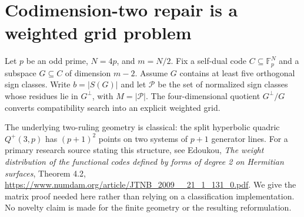 \section{Codimension-two repair is a weighted grid problem}
\label{sec:quotient-grid}

Let $p$ be an odd prime, $N=4p$, and $m=N/2$. Fix a self-dual code
$C\subseteq\mathbb F_p^N$ and a subspace $G\subseteq C$ of dimension
$m-2$. Assume $G$ contains at least five orthogonal sign classes.
Write $b=|S(G)|$ and let $\mathcal P$ be the set of normalized sign
classes whose residues lie in $G^\perp$, with $M=|\mathcal P|$.
The four-dimensional quotient $G^\perp/G$ converts compatibility
search into an explicit weighted grid.

The underlying two-ruling geometry is classical: the split hyperbolic
quadric $Q^+(3,p)$ has $(p+1)^2$ points on two systems of $p+1$
generator lines. For a primary research source stating this structure,
see Edoukou, \emph{The weight distribution of the functional codes
defined by forms of degree 2 on Hermitian surfaces}, Theorem 4.2,
\url{https://www.numdam.org/article/JTNB_2009__21_1_131_0.pdf}.
We give the matrix proof needed here rather than relying on a
classification implementation. No novelty claim is made for the
finite geometry or the resulting reformulation.

